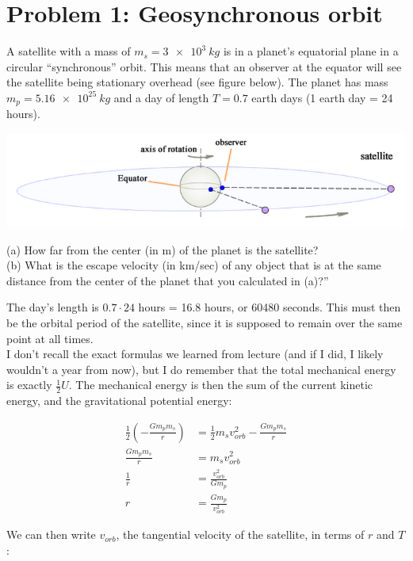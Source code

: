 \documentclass[12pt,a4paper]{report}
\begin{document}
\section{Problem 1: Geosynchronous orbit}

A satellite with a mass of $m_s = \SI{3e3}{kg}$ is in a planet's equatorial plane in a circular ``synchronous'' orbit. This means that an observer at the equator will see the satellite being stationary overhead (see figure below). The planet has mass $m_p = \SI{5.16e25}{kg}$ and a day of length $T = 0.7$ earth days (1 earth day = 24 hours).

\begin{center}
\includegraphics[scale=0.6]{Graphics/h5p1}
\end{center}

(a) How far from the center (in m) of the planet is the satellite?\\
(b) What is the escape velocity (in km/sec) of any object that is at the same distance from the center of the planet that you calculated in (a)?''

The day's length is $0.7 \cdot 24$ hours = 16.8 hours, or 60480 seconds. This must then be the orbital period of the satellite, since it is supposed to remain over the same point at all times.\\
I don't recall the exact formulas we learned from lecture (and if I did, I likely wouldn't a year from now), but I do remember that the total mechanical energy is exactly $\frac{1}{2} U$. The mechanical energy is then the sum of the current kinetic energy, and the gravitational potential energy:

\begin{align}
\frac{1}{2} \left(-\frac{G m_p m_s}{r}\right) &= \frac{1}{2} m_s v_{orb}^2 - \frac{G m_p m_s}{r}\\
\frac{G m_p m_s}{r} &= m_s v_{orb}^2\\
\frac{1}{r} &= \frac{v_{orb}^2}{G m_p}\\
r &= \frac{G m_p}{v_{orb}^2}
\end{align}

We can then write $v_{orb}$, the tangential velocity of the satellite, in terms of $r$ and $T$:
\end{document}
